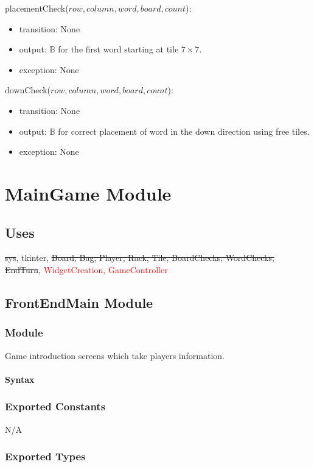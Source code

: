 \documentclass[12pt]{article}
\begin{document}
\noindent placementCheck($row, column, word, board, count$):
\begin{itemize}
\item transition: None
\item output: $\mathbb{B}$ for the first word starting at tile $7\times7$.
\item exception: None
\end{itemize}

\noindent downCheck($row, column, word, board, count$):
\begin{itemize}
\item transition: None
\item output: $\mathbb{B}$ for correct placement of word in the down direction using free tiles.
\item exception: None
\end{itemize}

\newpage

\section* {MainGame Module}

\subsection*{Uses}

\sout{sys}, tkinter, \sout{Board, Bag, Player, Rack, Tile, BoardChecks, WordChecks, EndTurn}, \textcolor{red}{WidgetCreation, GameController}

\subsection*{FrontEndMain Module}

\subsubsection*{Module}

Game introduction screens which take players information.

\paragraph*{Syntax}

\subsubsection*{Exported Constants}
N/A
\subsubsection*{Exported Types}
\end{document}
